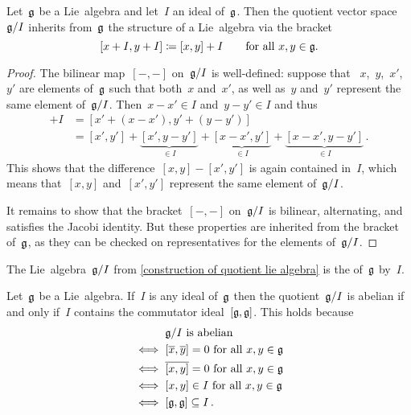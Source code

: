 \begin{proposition}
  \label{construction of quotient lie algebra}
  Let~$\mathfrak{g}$ be a Lie~algebra and let~$I$ an ideal of~$\mathfrak{g}$.
  Then the quotient vector space~$\mathfrak{g}/I$ inherits from~$\mathfrak{g}$ the structure of a Lie~algebra via the bracket
  \[
    [x+I, y+I]
    \coloneqq
    [x,y] + I
    \qquad
    \text{for all~$x, y \in \mathfrak{g}$.}
  \]
\end{proposition}


\begin{proof}
  The bilinear map~$[-,-]$ on~$\mathfrak{g}/I$ is well-defined:
  suppose that ~$x$,~$y$,~$x'$,~$y'$ are elements of~$\mathfrak{g}$ such that both~$x$ and~$x'$, as well as~$y$ and~$y'$ represent the same element of~$\mathfrak{g} / I$.
  Then~$x - x' \in I$ and~$y - y' \in I$ and thus
  \begin{align*}
    [x,y] + I
    &=
    [x' + (x-x'), y' + (y-y')]
    \\
    &=
    [x',y']
    + \underbrace{[x', y-y']}_{\in I}
    + \underbrace{[x-x', y']}_{\in I}
    + \underbrace{[x-x', y-y']}_{\in I} \,.
  \end{align*}
  This shows that the difference~$[x, y] - [x', y']$ is again contained in~$I$, which means that~$[x, y]$ and~$[x', y']$ represent the same element of~$\mathfrak{g} / I$.
  
  It remains to show that the bracket~$[-,-]$ on~$\mathfrak{g} / I$ is bilinear, alternating, and satisfies the Jacobi identity.
  But these properties are inherited from the bracket of~$\mathfrak{g}$, as they can be checked on representatives for the elements of~$\mathfrak{g} / I$.
\end{proof}


\begin{definition}
  The Lie~algebra~$\mathfrak{g} / I$ from \cref{construction of quotient lie algebra} is the  of~$\mathfrak{g}$ by~$I$.
\end{definition}


\begin{example}
  Let~$\mathfrak{g}$ be a Lie~algebra.
  If~$I$ is any ideal of~$\mathfrak{g}$ then the quotient~$\mathfrak{g} / I$ is abelian if and only if~$I$ contains the commutator ideal~$[\mathfrak{g}, \mathfrak{g}]$.
  This holds because
  \begin{align*}
    {}&
    \text{$\mathfrak{g} / I$ is abelian}
    \\
    \iff{}&
    \text{$[ \overline{x}, \overline{y}] = 0$ for all~$x, y \in \mathfrak{g}$}
    \\
    \iff{}&
    \text{$\overline{[x,y]} = 0$ for all~$x, y \in \mathfrak{g}$}
    \\
    \iff{}&
    \text{$[x,y] \in I$ for all~$x, y \in \mathfrak{g}$}
    \\
    \iff{}&
    [\mathfrak{g}, \mathfrak{g}] \subseteq I \,.
  \end{align*}
\end{example}


